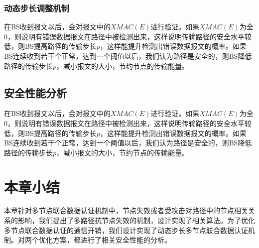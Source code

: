\subsubsection{动态步长调整机制}
在BS收到报文以后，会对报文中的$XMAC(E)$进行验证。如果$XMAC(E)$为全0，则说明有错误数据报文在路径中被检测出来，这样说明传输路径的安全水平较低，则BS提高路径的传输步长$p$，这样能提升检测出错误数据报文的概率。如果BS连续收到若干个正常，达到一个阈值以后，我们认为路径是安全的，则BS降低路径的传输步长$p$，减小报文的大小，节约节点的传输能量。
\subsection{安全性能分析}


在BS收到报文以后，会对报文中的$XMAC(E)$进行验证。如果$XMAC(E)$为全0，则说明有错误数据报文在路径中被检测出来，这样说明传输路径的安全水平较低，则BS提高路径的传输步长$p$，这样能提升检测出错误数据报文的概率。如果BS连续收到若干个正常，达到一个阈值以后，我们认为路径是安全的，则BS降低路径的传输步长$p$，减小报文的大小，节约节点的传输能量。





\section{本章小结}
本章针对多节点联合数据认证机制中，节点失效或者受攻击对路径中的节点相关关系的影响，我们提出了多路径抗节点失效的机制，设计实现了相关算法。为了优化多节点联合数据认证的通信开销，我们设计实现了动态步长多节点联合数据认证机制。对两个优化方案，都进行了相关安全性能的分析。



